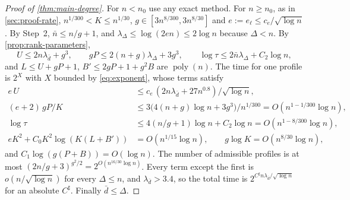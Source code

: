 \documentclass[11pt]{amsart}
\theoremstyle{plain}
\theoremstyle{definition}
\theoremstyle{remark}
\numberwithin{equation}{section}
\newcommand{\poly}{\operatorname{poly}}
\begin{document}
\begin{proof}[Proof of \cref{thm:main-degree}]
For $n<n_0$ use any exact method. For $n\ge n_0$, as in \cref{sec:proof-rate},
$n^{1/300}<K\le n^{1/30}$, $g\in[3n^{8/300},3n^{8/30}]$ and $e:=e_\ell\le c_e/\sqrt{\log n}$. By Step~2,
$\bar n\le n/g+1$, and $\lambda_\Delta\le\log(2en)\le2\log n$ because $\Delta<n$. By
\cref{prop:rank-parameters},
\[
  U\le2n\lambda_{\bar d}+g^3,\qquad gP\le2(n+g)\lambda_\Delta+3g^3,\qquad
  \log\tau\le2\bar n\lambda_\Delta+C_2\log n,
\]
and $L\le U+gP+1$, $B'\le2gP+1+g^2B$ are $\poly(n)$. The time for one profile is $2^X$ with $X$
bounded by \eqref{eq:exponent}, whose terms satisfy
\begin{align*}
  e\,U&\le c_e\,(2n\lambda_{\bar d}+27n^{0.8})/\sqrt{\log n},\\
  (e+2)\,gP/K&\le3\bigl(4(n+g)\log n+3g^3\bigr)/n^{1/300}=O(n^{1-1/300}\log n),\\
  \log\tau&\le4(n/g+1)\log n+C_2\log n=O(n^{1-8/300}\log n),\\
  eK^2+C_0K^2\log(K(L+B'))&=O(n^{1/15}\log n),\qquad g\log K=O(n^{8/30}\log n),
\end{align*}
and $C_1\log(g(P+B))=O(\log n)$. The number of admissible profiles is at most
$(2n/g+3)^{g^2/2}=2^{O(n^{16/30}\log n)}$. Every term except the first is $o(n/\sqrt{\log n})$ for
every $\Delta\le n$, and $\lambda_{\bar d}>3.4$, so the total time is
$2^{C^\sharp n\lambda_{\bar d}/\sqrt{\log n}}$ for an absolute $C^\sharp$. Finally $\bar d\le\Delta$.
\end{proof}
\end{document}
